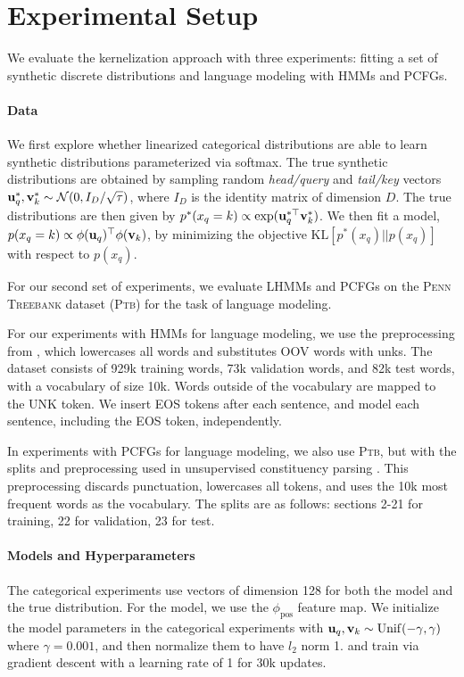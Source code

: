 \documentclass{article}
\newcommand\todo[1]{\textcolor{red}{#1}}
\begin{document}



\section{Experimental Setup}

We evaluate the kernelization approach with three experiments: fitting a set of synthetic discrete distributions and language modeling with HMMs and PCFGs.

\paragraph{Data}
We first explore whether linearized categorical distributions are able to learn synthetic distributions parameterized via softmax.
The true synthetic distributions are obtained by sampling random \textit{head/query} and \textit{tail/key} vectors $\mathbf{u}_q^*,\mathbf{v}_k^*\sim\mathcal{N}(0,I_D / \sqrt{\tau})$, where $I_D$ is the identity matrix of dimension $D$.
The true distributions are then given by $p^*(x_q = k) \propto \exp(\mathbf{u}_q^{*\top}\mathbf{v}^*_k)$.
We then fit a model, $p(x_q=k) \propto \phi(\mathbf{u}_q)^\top\phi(\mathbf{v}_k)$, by minimizing the objective $\textrm{KL}[p^*(x_q) ||p(x_q)]$ with respect to $p(x_q)$.

For our second set of experiments, we evaluate LHMMs and PCFGs on the \textsc{Penn Treebank} dataset (\textsc{Ptb}) \citep{ptb} for the task of language modeling.

For our experiments with HMMs for language modeling, we use the preprocessing from \citet{mikolov-2011},
which lowercases all words and substitutes OOV words with unks. 
The  dataset consists of 929k training words, 73k validation words, and 82k test words, with a vocabulary of size 10k.
Words outside of the vocabulary are mapped to the UNK token.
We insert EOS tokens after each sentence, and model each sentence, including the EOS token, independently.

In experiments with PCFGs for language modeling, we also use \textsc{Ptb}, but with the splits and preprocessing used in unsupervised constituency parsing \citep{shen2018prpn,shen2018ordered,kim2019cpcfg}. This preprocessing discards punctuation, lowercases all tokens, and uses the 10k most frequent words as the vocabulary.
The splits are as follows: sections 2-21 for training, 22 for validation, 23 for test. 

\paragraph{Models and Hyperparameters}
The categorical experiments use vectors of dimension 128 for both the model and the true distribution.
For the model, we use the $\phi_{\textrm{pos}}$ feature map.
We initialize the model parameters in the categorical experiments with $\mathbf{u}_q,\mathbf{v}_k\sim\mathrm{Unif}(-\gamma,\gamma)$ where $\gamma=0.001$, and then normalize them to have $l_2$ norm 1.
and train via gradient descent with a learning rate of 1 for 30k updates.
\end{document}
